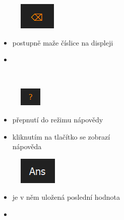 \documentclass[a4paper, 12pt]{article}
\begin{document}
\begin{minipage}{0.07\textwidth}
\begin{figure}[H]
\includegraphics[scale=0.7]{back.png}
\end{figure}
\end{minipage}
\begin{minipage}[t]{0.7\textwidth}
\begin{itemize}
\item postupně maže číslice na displeji
\item \keys{\backdel}
\end{itemize}
\end{minipage}
\\
\begin{minipage}{0.07\textwidth}
\begin{figure}[H]
\includegraphics[scale=0.7]{otaznik.png}
\end{figure}
\end{minipage}
\begin{minipage}{0.45\textwidth}
\phantom{desdeded}
\begin{itemize}
\item {} přepnutí do režimu nápovědy
\item kliknutím na tlačítko se zobrazí\\ nápověda
\end{itemize}
\end{minipage}
\begin{minipage}{0.07\textwidth}
\begin{figure}[H]
\includegraphics[scale=0.7]{ans.png}
\end{figure}
\end{minipage}
\begin{minipage}{0.45\textwidth}
\phantom{desdeded}
\begin{itemize}
\item je v něm uložená poslední hodnota
\item {}
\end{itemize}
\end{minipage}
\end{document}
